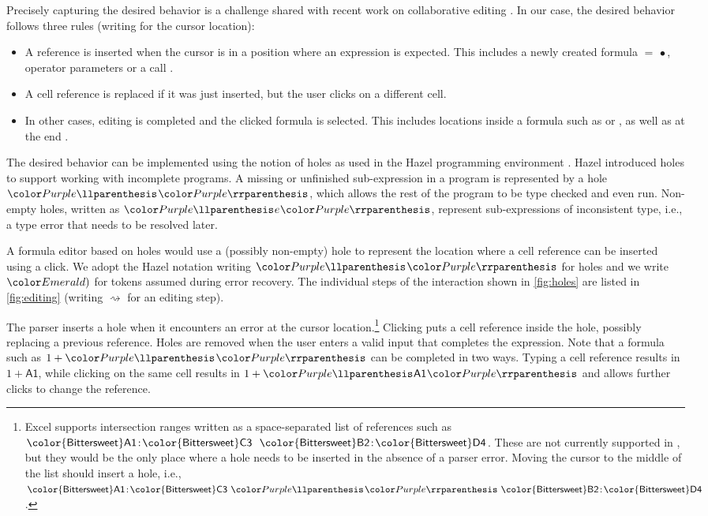 Precisely capturing the desired behavior is a challenge shared with recent work on collaborative
editing \cite{litt-2022-peritext}. In our case, the desired behavior follows three rules
(writing  for the cursor location):

\begin{itemize}[leftmargin=0.5cm]
\item A reference is inserted when the cursor is in a position where an expression is expected.
  This includes a newly created formula $\mathsf{=}\,\bullet$, operator parameters
   or a call .
\item A cell reference is replaced if it was just inserted, but the user clicks on a different cell.
\item In other cases, editing is completed and the clicked formula is selected. This includes
  locations inside a formula such as  or , as well as
  at the end .
\end{itemize}

The desired behavior can be implemented using the notion of holes \cite{mcbride-2000-holes}
as used in the Hazel programming environment \cite{omar-2017-hazelnut,omar-2019-typedholes}.
Hazel introduced holes to support working with incomplete programs. A missing or unfinished
sub-expression in a program is represented by a hole $\hhole{}$, which allows
the rest of the program to be type checked and even run. Non-empty holes, written as
$\hhole{e}$, represent sub-expressions of inconsistent type, i.e.,
a type error that needs to be resolved later.

A formula editor based on holes would use a (possibly non-empty) hole to represent the location
where a cell reference can be inserted using a click. We adopt the Hazel notation writing
$\hhole{}$ for holes and we write $\errrec{)}$ for tokens assumed during error recovery.
The individual steps of the interaction shown in \autoref{fig:holes} are listed in
\autoref{fig:editing} (writing $\rightsquigarrow$ for an editing step).

The parser inserts a hole when it encounters an error at the cursor
location.\footnote{Excel supports intersection ranges written as a space-separated list of
references such as $\mathsf{\color{Bittersweet} A1}\!:\!\mathsf{\color{Bittersweet} C3}~~\mathsf{\color{Bittersweet} B2}\!:\!\mathsf{\color{Bittersweet} D4}$.
These are not currently supported in \Timeline, but they would be the only place where a hole needs to
be inserted in the absence of a parser error. Moving the cursor to the middle of the list should
insert a hole, i.e., $\mathsf{\color{Bittersweet} A1}\!:\!\mathsf{\color{Bittersweet} C3}~\hhole{}~\mathsf{\color{Bittersweet} B2}\!:\!\mathsf{\color{Bittersweet} D4}$.}
Clicking puts a cell reference inside the hole, possibly replacing a previous reference.
Holes are removed when the user enters a valid input that completes the expression.
Note that a formula such as $1+\hhole{}$ can be completed in two ways. Typing a cell reference
results in $1 + \mathsf{A1}$, while clicking on the same cell results in
$1 + \hhole{\mathsf{A1}}$ and allows further clicks to change the reference.
